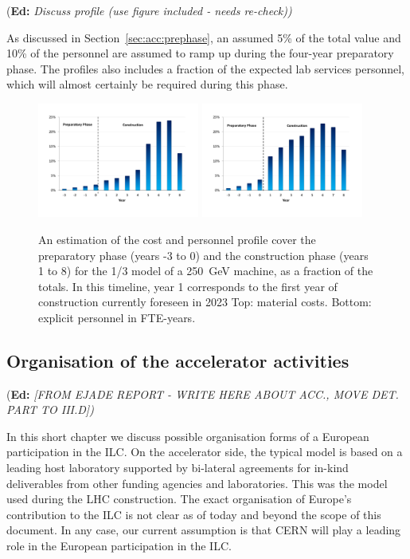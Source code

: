 \documentclass[%
 reprint,
 floatfix,
 amsmath,amssymb,
 aps,
]{revtex4-1}
\newif\ifEdNotes \EdNotestrue
\newcommand{\doednote}[1]{{\color{red}(\textbf{Ed:} \textit{#1)}}}
\newcommand{\ednote}[1]{\ifEdNotes 
  \doednote{#1} 
\fi}
\begin{document}
\ednote{Discuss profile (use figure included - needs re-check)}

As discussed in Section~\ref{sec:acc:prephase}, an assumed 5\% of the total value and 10\% of the personnel are assumed
to ramp up during the four-year preparatory phase. The profiles also includes a fraction
of the expected lab services personnel, which will almost certainly be required during this
phase. 

\begin{figure}[htbp]
\includegraphics[width=0.475\textwidth]{figures/ilc-eu-ikc-cost-profile-blue-250me.pdf}
\includegraphics[width=0.475\textwidth]{figures/ilc-eu-ikc-cost-profile-blue-fte.pdf}
\caption{\label{fig:costprofile:costprofile} An estimation of the cost and personnel profile cover the preparatory phase (years -3 to 0) 
and the construction phase (years 1 to 8) for the 1/3 model of a 250~GeV machine, as a fraction of the
totals. In this timeline, 
year 1 corresponds to the first year of construction currently foreseen in 2023 
Top: material costs. Bottom: explicit personnel in FTE-years.
}
\end{figure}


\subsection{\label{sec:acc:org}Organisation of the accelerator activities}
\ednote{[FROM EJADE REPORT - WRITE HERE ABOUT ACC.,  MOVE DET. PART TO III.D]}
In this short chapter we discuss possible organisation forms of a European 
participation in the ILC. 
On the accelerator side, the typical model is based on a leading host laboratory supported by 
bi-lateral agreements for in-kind deliverables from other funding agencies and 
laboratories. This was the model used during the LHC construction. 
The exact organisation of Europe's contribution to the ILC is not clear as of today 
and beyond the scope of this document. In any case, our current assumption is that 
CERN will play a leading role in the European participation in the ILC.
\end{document}
